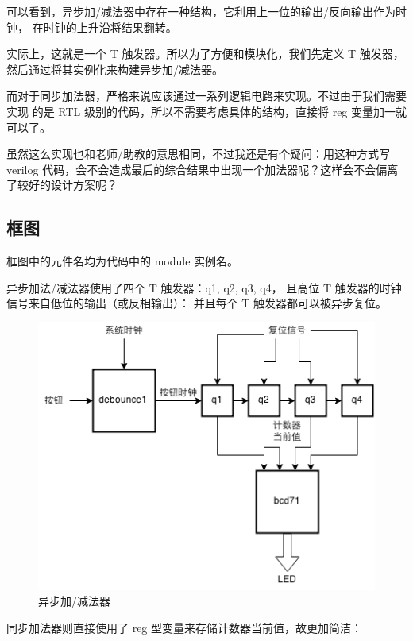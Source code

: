 \documentclass[11pt,a4paper]{article}
\begin{document}
可以看到，异步加/减法器中存在一种结构，它利用上一位的输出/反向输出作为时钟，
在时钟的上升沿将结果翻转。

实际上，这就是一个 T 触发器。所以为了方便和模块化，我们先定义 T 触发器，
然后通过将其实例化来构建异步加/减法器。

而对于同步加法器，严格来说应该通过一系列逻辑电路来实现。不过由于我们需要实现
的是 RTL 级别的代码，所以不需要考虑具体的结构，直接将 reg 变量加一就可以了。

虽然这么实现也和老师/助教的意思相同，不过我还是有个疑问：用这种方式写 verilog 
代码，会不会造成最后的综合结果中出现一个加法器呢？这样会不会偏离了较好的设计方案呢？

\subsection{框图}
框图中的元件名均为代码中的 module 实例名。

异步加法/减法器使用了四个 T 触发器：q1, q2, q3, q4，
且高位 T 触发器的时钟信号来自低位的输出（或反相输出）：
并且每个 T 触发器都可以被异步复位。

\begin{figure}[H]
  \centering
    \includegraphics{exp1_asyc_96_dpi}
  \caption{异步加/减法器}
\end{figure}


同步加法器则直接使用了 reg 型变量来存储计数器当前值，故更加简洁：
\end{document}
